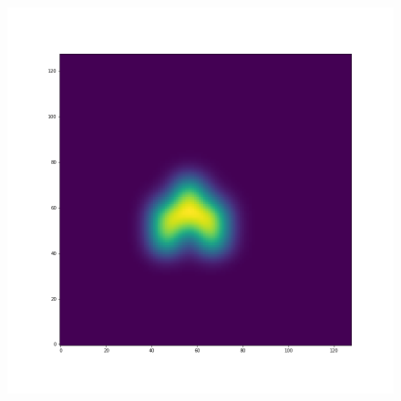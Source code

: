 \documentclass[12pt,a4paper]{article}
\begin{document}
\begin{figure}[H]
\begin{minipage}{.3\textwidth}
\end{minipage}%
\begin{minipage}{.3\textwidth}
  \centering
  \includegraphics[width=\linewidth]{Pictures/Solve2DWhiteBearMovementTestGodunov/Solve2DWhiteBearMovementTest_t20.png}
\end{minipage}
\end{figure}
\end{document}
